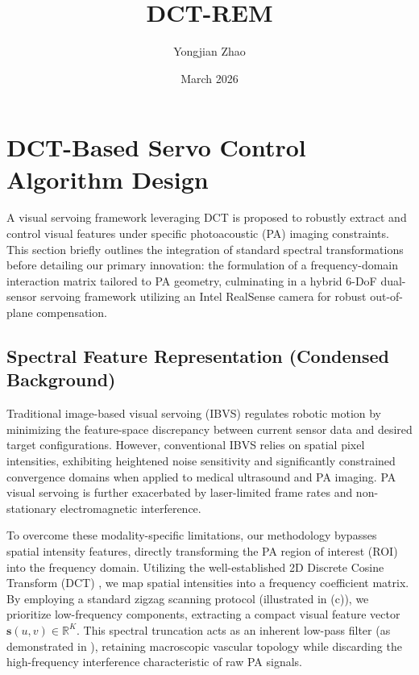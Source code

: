 \documentclass{article}
\title{DCT-REM}
\author{Yongjian Zhao}
\date{March 2026}
\begin{document}
\maketitle

\section{DCT-Based Servo Control Algorithm Design}
\label{sec:algorithm}

A visual servoing framework leveraging DCT is proposed to robustly extract and control visual features under specific photoacoustic (PA) imaging constraints. This section briefly outlines the integration of standard spectral transformations before detailing our primary innovation: the formulation of a frequency-domain interaction matrix tailored to PA geometry, culminating in a hybrid 6-DoF dual-sensor servoing framework utilizing an Intel RealSense camera for robust out-of-plane compensation.

\subsection{Spectral Feature Representation (Condensed Background)}
\label{sec:Spectral_Feature_Representation}

Traditional image-based visual servoing (IBVS) regulates robotic motion by minimizing the feature-space discrepancy between current sensor data and desired target configurations. However, conventional IBVS relies on spatial pixel intensities, exhibiting heightened noise sensitivity and significantly constrained convergence domains when applied to medical ultrasound and PA imaging. PA visual servoing is further exacerbated by laser-limited frame rates and non-stationary electromagnetic interference.

To overcome these modality-specific limitations, our methodology bypasses spatial intensity features, directly transforming the PA region of interest (ROI) into the frequency domain. Utilizing the well-established 2D Discrete Cosine Transform (DCT) \cite{ahmed2006discrete}, we map spatial intensities into a frequency coefficient matrix. By employing a standard zigzag scanning protocol (illustrated in (c)), we prioritize low-frequency components, extracting a compact visual feature vector \(\boldsymbol{s}(u,v) \in \mathbb{R}^K\). This spectral truncation acts as an inherent low-pass filter (as demonstrated in ), retaining macroscopic vascular topology while discarding the high-frequency interference characteristic of raw PA signals.
\end{document}

